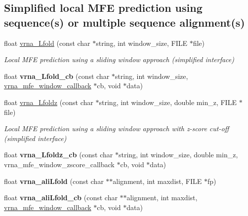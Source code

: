 \subsection*{Simplified local M\+FE prediction using sequence(s) or multiple sequence alignment(s)}
\begin{DoxyCompactItemize}
\item 
float \mbox{\hyperlink{group__mfe__window_ga4918cce52bf69c1913cda503b2ac75d8}{vrna\+\_\+\+Lfold}} (const char $\ast$string, int window\+\_\+size, F\+I\+LE $\ast$file)
\begin{DoxyCompactList}\small\item\em Local M\+FE prediction using a sliding window approach (simplified interface) \end{DoxyCompactList}\item 
\mbox{\label{group__mfe__window_ga8b70293ad3c9dd3dc384d06290bf8069}} 
float {\bfseries vrna\+\_\+\+Lfold\+\_\+cb} (const char $\ast$string, int window\+\_\+size, \mbox{\hyperlink{group__mfe__window_ga4f3e5bc214ef803074ace313cb9571b4}{vrna\+\_\+mfe\+\_\+window\+\_\+callback}} $\ast$cb, void $\ast$data)
\item 
float \mbox{\hyperlink{group__mfe__window_ga27fddda5fc63eb49c861e38845fc34b4}{vrna\+\_\+\+Lfoldz}} (const char $\ast$string, int window\+\_\+size, double min\+\_\+z, F\+I\+LE $\ast$file)
\begin{DoxyCompactList}\small\item\em Local M\+FE prediction using a sliding window approach with z-\/score cut-\/off (simplified interface) \end{DoxyCompactList}\item 
\mbox{\label{group__mfe__window_ga41b18568b846f1db70cdf2fe83b0ed47}} 
float {\bfseries vrna\+\_\+\+Lfoldz\+\_\+cb} (const char $\ast$string, int window\+\_\+size, double min\+\_\+z, vrna\+\_\+mfe\+\_\+window\+\_\+zscore\+\_\+callback $\ast$cb, void $\ast$data)
\item 
\mbox{\label{group__mfe__window_gaa43d3de352753529a4578cb02cd8bc52}} 
float {\bfseries vrna\+\_\+ali\+Lfold} (const char $\ast$$\ast$alignment, int maxdist, F\+I\+LE $\ast$fp)
\item 
\mbox{\label{group__mfe__window_ga09756293446a6ae67c783bc8d567d884}} 
float {\bfseries vrna\+\_\+ali\+Lfold\+\_\+cb} (const char $\ast$$\ast$alignment, int maxdist, \mbox{\hyperlink{group__mfe__window_ga4f3e5bc214ef803074ace313cb9571b4}{vrna\+\_\+mfe\+\_\+window\+\_\+callback}} $\ast$cb, void $\ast$data)
\end{DoxyCompactItemize}


